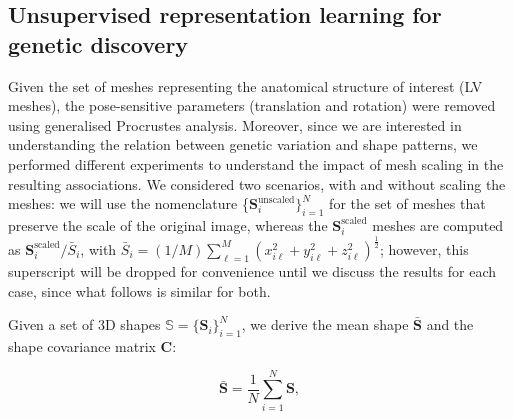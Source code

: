 

\subsection{Unsupervised representation learning for genetic discovery}
\label{results:dimensionality_reduction}
Given the set of meshes representing the anatomical structure of interest (LV meshes), the pose-sensitive parameters (translation and rotation) were removed using generalised Procrustes analysis. Moreover, since we are interested in understanding the relation between genetic variation and shape patterns, we performed different experiments to understand the impact of mesh scaling in the resulting associations. We considered two scenarios, with and without scaling the meshes: we will use the nomenclature \{$\textbf{S}_{i}^{\text{unscaled}}\}_{i=1}^{N}$ for the set of meshes that preserve the scale of the original image, whereas the $\textbf{S}_{i}^{\text{scaled}}$ meshes are computed as $\textbf{S}_{i}^{\text{scaled}}/\bar{S}_i$, with $\bar{S}_i=(1/M)\sum_{\ell=1}^{M}(x_{i\ell}^2+y_{i\ell}^2+z_{i\ell}^2)^{\frac{1}{2}}$; however, this superscript will be dropped for convenience until we discuss the results for each case, since what follows is similar for both.

Given a set of 3D shapes $\mathbb{S}=\{\textbf{S}_i\}_{i=1}^{N}$, we derive the mean shape $\bar{\textbf{S}}$ and the shape covariance matrix $\textbf{C}$:

\begin{equation}
\bar{\textbf{S}}=\frac{1}{N}\sum_{i=1}^{N}{\textbf{S}},
\end{equation}

